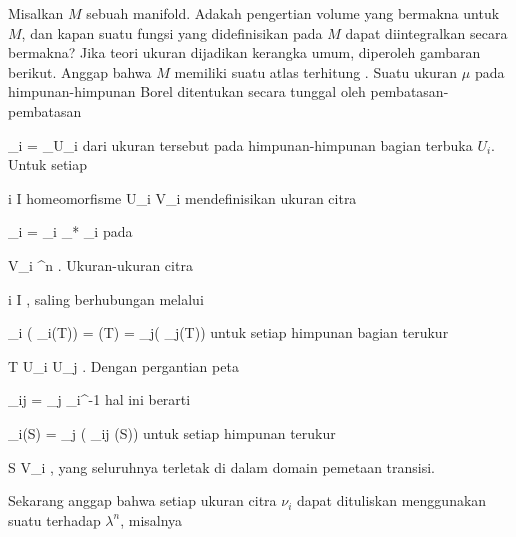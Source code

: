 
Misalkan $M$ sebuah manifold. Adakah pengertian volume yang bermakna untuk
 {} {}
$M$, dan kapan suatu fungsi yang didefinisikan pada $M$ dapat diintegralkan secara bermakna? Jika teori ukuran dijadikan kerangka umum, diperoleh gambaran berikut. Anggap bahwa $M$ memiliki suatu atlas terhitung
. Suatu ukuran $\mu$ pada himpunan-himpunan Borel
 ditentukan secara tunggal oleh pembatasan-pembatasan

\mavergleichskette
{\vergleichskette
{ \mu_i
}
{ = }{ \mu \vert_{U_i }
}
{  }{
}
{    }{
}
{   }{
}
}
{}{}{}
dari ukuran tersebut pada himpunan-himpunan bagian terbuka $U_i$. Untuk setiap

\mavergleichskette
{\vergleichskette
{ i
}
{ \in }{ I
}
{  }{
}
{    }{
}
{   }{
}
}
{}{}{}
homeomorfisme
 {U_i } { V_i
} {}
mendefinisikan ukuran citra

\mavergleichskette
{\vergleichskette
{ \nu_i
}
{ = }{ {\alpha_i }_* \mu_i
}
{  }{
}
{    }{
}
{   }{
}
}
{}{}{}
pada

\mavergleichskette
{\vergleichskette
{ V_i
}
{ \subseteq }{ \R^n
}
{  }{
}
{    }{
}
{   }{
}
}
{}{}{.}
Ukuran-ukuran citra

 {}
 {i \in I} {}
 {} {} {} {,}
saling berhubungan melalui

\mavergleichskettedisp
{\vergleichskette
{\nu_i ( \alpha_i(T))
}
{ =} { \mu(T)
}
{ =} {\nu_j( \alpha_j(T))
}
{ } {
}
{ } {
}
}
{}{}{}
untuk setiap himpunan bagian terukur

\mavergleichskette
{\vergleichskette
{ T
}
{ \subseteq }{ U_i \cap U_j
}
{  }{
}
{    }{
}
{   }{
}
}
{}{}{.}
Dengan pergantian peta

\mavergleichskette
{\vergleichskette
{ \psi_{ij}
}
{ = }{ \alpha_j \circ \alpha_i^{-1}
}
{  }{
}
{    }{
}
{   }{
}
}
{}{}{}
hal ini berarti

\mavergleichskettedisp
{\vergleichskette
{ \nu_i(S)
}
{ =} { \nu_j ( \psi_{ij} (S))
}
{ } {
}
{ } {
}
{ } {
}
}
{}{}{}
untuk setiap himpunan terukur

\mavergleichskette
{\vergleichskette
{ S
}
{ \subseteq }{ V_i
}
{  }{
}
{    }{
}
{   }{
}
}
{}{}{,}
yang seluruhnya terletak di dalam domain pemetaan transisi.

Sekarang anggap bahwa setiap ukuran citra $\nu_i$ dapat dituliskan menggunakan suatu
terhadap
$\lambda^n$, misalnya

